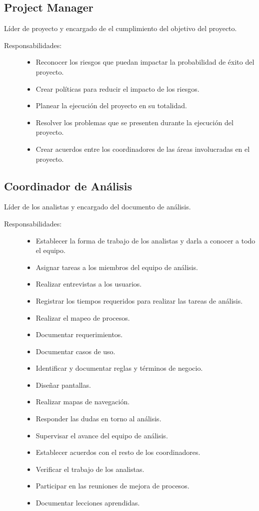 \subsection{Project Manager}
	Líder de proyecto y encargado de el cumplimiento del objetivo del proyecto.
\begin{description}
	\item[Responsabilidades:] \cdtEmpty 	
    \begin{itemize}
    	\item Reconocer los riesgos que puedan impactar la probabilidad de éxito del proyecto.
    	\item Crear políticas para reducir el impacto de los riesgos.
    	\item Planear la ejecución del proyecto en su totalidad.
    	\item Resolver los problemas que se presenten durante la ejecución del proyecto.
    	\item Crear acuerdos entre los coordinadores de las áreas involucradas en el proyecto.
    \end{itemize}
\end{description}

\subsection{Coordinador de Análisis}
	Líder de los analistas y encargado del documento de análisis.
\begin{description}
	\item[Responsabilidades:] \cdtEmpty 	
    \begin{itemize}
    	\item Establecer la forma de trabajo de los analistas y darla a conocer a todo el equipo.
    	\item Asignar tareas a los miembros del equipo de análisis.
    	\item Realizar entrevistas a los usuarios.
    	\item Registrar los tiempos requeridos para realizar las tareas de análisis.
    	\item Realizar el mapeo de procesos.
    	\item Documentar requerimientos.
    	\item Documentar casos de uso.
    	\item Identificar y documentar reglas y términos de negocio.
    	\item Diseñar pantallas.
    	\item Realizar mapas de navegación.
    	\item Responder las dudas en torno al análisis.
    	\item Supervisar el avance del equipo de análisis.
    	\item Establecer acuerdos con el resto de los coordinadores.
    	\item Verificar el trabajo de los analistas.
    	\item Participar en las reuniones de mejora de procesos.
    	\item Documentar lecciones aprendidas.
    \end{itemize}
\end{description}

